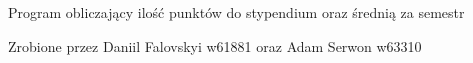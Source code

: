 \label{index_md_F___WSIZ_Projekt_Projekt_Stypendium_Kalkulator_stypendium_PunktyStypendium_SredniaSemestralna_readme}%
 Program obliczający ilość punktów do stypendium oraz średnią za semestr

Zrobione przez Daniil Falovskyi w61881 oraz Adam Serwon w63310 